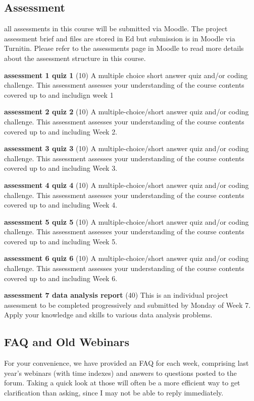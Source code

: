 \documentclass[11pt]{article}
\begin{document}
\subsection{Assessment}\label{subsec:assessment2}
all assessments in this course will be submitted via Moodle.
The project assessment brief and files are stored in Ed but submission is in Moodle via Turnitin.
Please refer to the assessments page in Moodle to read more details about the assessment structure in this course.
\begin{description}
  \item \textbf{assessment 1 quiz 1} (10) A multiple choice short answer quiz and/or coding challenge. This assessment  assesses your understanding of the course contents covered up to and includign week 1
  \item \textbf{assessment 2 quiz 2} (10) A multiple-choice/short answer quiz and/or coding challenge. This assessment assesses your understanding of the course contents covered up to and including Week 2.
  \item \textbf{assessment 3 quiz 3} (10) A multiple-choice/short answer quiz and/or coding challenge. This assessment assesses your understanding of the course contents covered up to and including Week 3.
  \item \textbf{assessment 4 quiz 4} (10) A multiple-choice/short answer quiz and/or coding challenge. This assessment assesses your understanding of the course contents covered up to and including Week 4.
  \item \textbf{assessment 5 quiz 5} (10) A multiple-choice/short answer quiz and/or coding challenge. This assessment assesses your understanding of the course contents covered up to and including Week 5.
  \item \textbf{assessment 6 quiz 6} (10) A multiple-choice/short answer quiz and/or coding challenge. This assessment assesses your understanding of the course contents covered up to and including Week 6.
  \item \textbf{assessment 7 data analysis report} (40) This is an individual project assessment to be completed progressively and submitted by Monday of Week 7. Apply your knowledge and skills to various data analysis problems.
\item \end{description}

\subsection{FAQ and Old Webinars}
For your convenience, we have provided an FAQ for each week, comprising last year's webinars (with time indexes) and answers to questions posted to the forum.
Taking a quick look at those will often be a more efficient way to get clarification than asking, since I may not be able to reply immediately.
\end{document}
